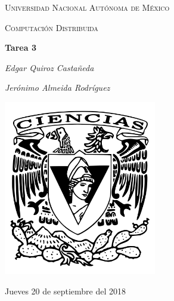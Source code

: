 \documentclass[12pt,a4paper]{report}
\begin{document}
\begin{titlepage}
	\centering
	{\scshape\LARGE Universidad Nacional Autónoma de México \par}
	\vspace{1cm}
	{\scshape\Large Computación Distribuida\par}
	\vspace{1.5cm}
	{\huge\bfseries Tarea 3\par}
	\vspace{.5cm}
	{\Large\itshape Edgar Quiroz Castañeda \par}
    \vspace{.5cm}
	{\Large\itshape Jerónimo Almeida Rodríguez \par}
	\vfill
	 \includegraphics[width=0.5\textwidth]{escudo_f-ciencias.png}
	\vfill

	{\large Jueves 20 de septiembre del 2018 \par}
\end{titlepage}

\pagebreak
\setlength{\voffset}{-0.75in}
\setlength{\headsep}{5pt}
\end{document}

